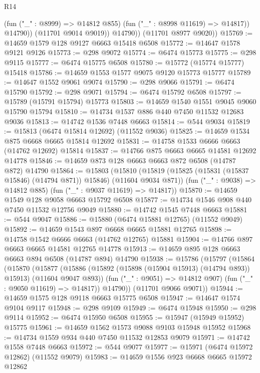 \begin{lexlean}{R14}
\begin{coremodule}
                  (fun ("_" : @8999) => @14812 @855)
                  (fun ("_" : @8998 @11619) => @14817))
                @14790))
            (@11701 @9014 @9019))
          @14790))
      (@11701 @8977 @9020))
@15769 := @14659 @1579 @128 @9127 @6663 @15418 @6508
@15772 := @14647 @1578 @9121 @9126
@15773 := @298 @9072
@15774 := @6474 @15773
@15775 := @298 @9115
@15777 := @6474 @15775 @6508
@15780 := @15772 (@15774 @15777) @15418
@15786 := @14659 @1553 @1577 @9075 @9120 @15773 @15777
@15789 := @14647 @1552 @9061 @9074
@15790 := @298 @9066
@15791 := @6474 @15790
@15792 := @298 @9071
@15794 := @6474 @15792 @6508
@15797 := @15789 (@15791 @15794) @15773
@15803 := @14659 @1540 @1551 @9045 @9060 @15790 @15794
@15810 := @14734 @1537 @886 @440 @7450 @11532 @12683 @9036
@15813 := @14742 @1536 @7448 @6663
@15814 := @544 @9034
@15819 := @15813 (@6474 @15814 @12692) (@11552 @9036)
@15825 := @14659 @1534 @875 @6668 @6665 @15814 @12692
@15831 := @14758 @1533 @6666 @6663 (@14762 @12692) @15814
@15837 := @14766 @875 @6663 @6665 @14581 @12692 @14778
@15846 := @14659 @873 @128 @6663 @6663 @872 @6508 (@14787 @872) @14790
@15864 := @15803
    (@15810
      (@15819 (@15825 (@15831 (@15837 @15846) (@14794 @871)) @15846) (@11604 @9034 @871))
      (fun ("_" : @9038) => @14812 @885)
      (fun ("_" : @9037 @11619) => @14817))
@15870 := @14659 @1549 @128 @9058 @6663 @15792 @6508
@15877 := @14734 @1546 @908 @440 @7450 @11532 @12756 @9049
@15880 := @14742 @1545 @7448 @6663
@15881 := @544 @9047
@15886 := @15880 (@6474 @15881 @12765) (@11552 @9049)
@15892 := @14659 @1543 @897 @6668 @6665 @15881 @12765
@15898 := @14758 @1542 @6666 @6663 (@14762 @12765) @15881
@15904 := @14766 @897 @6663 @6665 @14581 @12765 @14778
@15913 := @14659 @895 @128 @6663 @6663 @894 @6508 (@14787 @894) @14790
@15938 := @15786
    (@15797
      (@15864
        (@15870
          (@15877
            (@15886 (@15892 (@15898 (@15904 @15913) (@14794 @893)) @15913) (@11604 @9047 @893))
            (fun ("_" : @9051) => @14812 @907)
            (fun ("_" : @9050 @11619) => @14817))
          @14790))
      (@11701 @9066 @9071))
@15944 := @14659 @1575 @128 @9118 @6663 @15775 @6508
@15947 := @14647 @1574 @9104 @9117
@15948 := @298 @9109
@15949 := @6474 @15948
@15950 := @298 @9114
@15952 := @6474 @15950 @6508
@15955 := @15947 (@15949 @15952) @15775
@15961 := @14659 @1562 @1573 @9088 @9103 @15948 @15952
@15968 := @14734 @1559 @934 @440 @7450 @11532 @12853 @9079
@15971 := @14742 @1558 @7448 @6663
@15972 := @544 @9077
@15977 := @15971 (@6474 @15972 @12862) (@11552 @9079)
@15983 := @14659 @1556 @923 @6668 @6665 @15972 @12862

\end{coremodule}
\end{lexlean}

